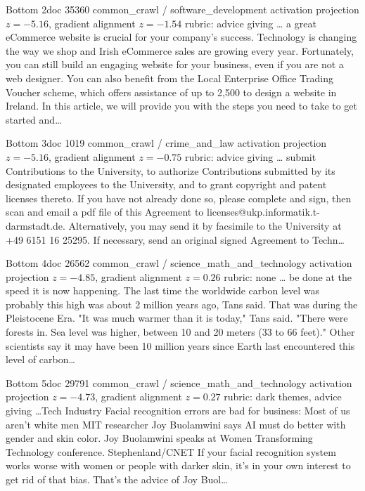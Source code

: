 \begin{docbox}{Bottom 2}{doc 35360 \textbullet{} common\_crawl / software\_development \textbullet{} activation projection $z=-5.16$, gradient alignment $z=-1.54$ \textbullet{} rubric: advice giving}
\ldots{} a great eCommerce website is crucial for your company’s success. Technology is changing the way we shop and Irish eCommerce sales are growing every year. Fortunately, you can still build an engaging website for your business, even if you are not a web designer. You can also benefit from the Local Enterprise Office Trading Voucher scheme, which offers assistance of up to \texteuro{}2,500 to design a website in Ireland. In this article, we will provide you with the steps you need to take to get started and\ldots{}
\end{docbox}

\begin{docbox}{Bottom 3}{doc 1019 \textbullet{} common\_crawl / crime\_and\_law \textbullet{} activation projection $z=-5.16$, gradient alignment $z=-0.75$ \textbullet{} rubric: advice giving}
\ldots{} submit Contributions to the University, to authorize Contributions submitted by its designated employees to the University, and to grant copyright and patent licenses thereto. If you have not already done so, please complete and sign, then scan and email a pdf file of this Agreement to licenses@ukp.informatik.t-darmstadt.de. Alternatively, you may send it by facsimile to the University at +49 6151 16 25295. If necessary, send an original signed Agreement to Techn\ldots{}
\end{docbox}

\begin{docbox}{Bottom 4}{doc 26562 \textbullet{} common\_crawl / science\_math\_and\_technology \textbullet{} activation projection $z=-4.85$, gradient alignment $z=0.26$ \textbullet{} rubric: none}
\ldots{} be done at the speed it is now happening.  The last time the worldwide carbon level was probably this high was about 2 million years ago, Tans said. That was during the Pleistocene Era.  "It was much warmer than it is today," Tans said. "There were forests in. Sea level was higher, between 10 and 20 meters (33 to 66 feet)."  Other scientists say it may have been 10 million years since Earth last encountered this level of carbon\ldots{}
\end{docbox}

\begin{docbox}{Bottom 5}{doc 29791 \textbullet{} common\_crawl / science\_math\_and\_technology \textbullet{} activation projection $z=-4.73$, gradient alignment $z=0.27$ \textbullet{} rubric: dark themes, advice giving}
\ldots{}Tech Industry  Facial recognition errors are bad for business: Most of us aren't white men  MIT researcher Joy Buolamwini says AI must do better with gender and skin color.  Joy Buolamwini speaks at Women Transforming Technology conference. Stephenland/CNET  If your facial recognition system works worse with women or people with darker skin, it's in your own interest to get rid of that bias.  That's the advice of Joy Buol\ldots{}
\end{docbox}

